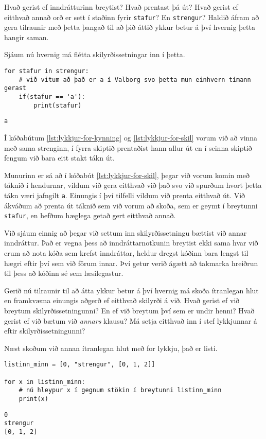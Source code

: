 Hvað gerist ef inndrátturinn breytist?
Hvað prentast þá út?
Hvað gerist ef eitthvað annað orð er sett í staðinn fyrir \texttt{stafur}?
En \texttt{strengur}?
Haldið áfram að gera tilraunir með þetta þangað til að þið áttið ykkur betur á því hvernig þetta hangir saman.

Sjáum nú hvernig má flétta skilyrðissetningar inn í þetta.

\lstset{style=venjulegt}
\begin{lstlisting}[caption=For-lykkja og skilyrðissetningar, label=lst:lykkjur-for-skil]
for stafur in strengur:
	# við vitum að það er a í Valborg svo þetta mun einhvern tímann gerast
	if(stafur == 'a'):
		print(stafur)
\end{lstlisting}
\lstset{style=uttak}
\begin{lstlisting}
a
\end{lstlisting}

Í kóðabútum \ref{lst:lykkjur-for-kynning} og \ref{lst:lykkjur-for-skil} vorum við að vinna með sama strenginn, í fyrra skiptið prentaðist hann allur út en í seinna skiptið fengum við bara eitt stakt tákn út.

Munurinn er sá að í kóðabút \ref{lst:lykkjur-for-skil}, þegar við vorum komin með táknið í hendurnar, vildum við gera eitthvað við það svo við spurðum hvort þetta tákn væri jafngilt \texttt{a}.
Einungis í því tilfelli vildum við prenta eitthvað út.
Við ákváðum að prenta út táknið sem við vorum að skoða, sem er geymt í breytunni \texttt{stafur}, en hefðum hæglega getað gert eitthvað annað.

Við sjáum einnig að þegar við settum inn skilyrðissetningu bættist við annar inndráttur.
Það er vegna þess að inndráttarnotkunin breytist ekki sama hvar við erum að nota kóða sem krefst inndráttar, heldur dregst kóðinn bara lengst til hægri eftir því sem við förum innar. 
Því getur verið ágætt að takmarka hreiðrun til þess að kóðinn sé sem læsilegastur.

Gerið nú tilraunir til að átta ykkur betur á því hvernig má skoða ítranlegan hlut en framkvæma einungis aðgerð ef eitthvað skilyrði á við.
Hvað gerist ef við breytum skilyrðissetningunni?
En ef við breytum því sem er undir henni?
Hvað gerist ef við bætum við \textit{annars} klausu?
Má setja eitthvað inn í stef lykkjunnar á eftir skilyrðissetningunni?

Næst skoðum við annan ítranlegan hlut með for lykkju, það er listi.

\lstset{style=venjulegt}	
	
\begin{lstlisting}[caption=For-lykkja með lista, label=lst:lykkjur-for-listi]
listinn_minn = [0, "strengur", [0, 1, 2]]

for x in listinn_minn:
	# nú hleypur x í gegnum stökin í breytunni listinn_minn
	print(x)

\end{lstlisting}
\lstset{style=uttak}
\begin{lstlisting}	
0
strengur
[0, 1, 2]
\end{lstlisting}



